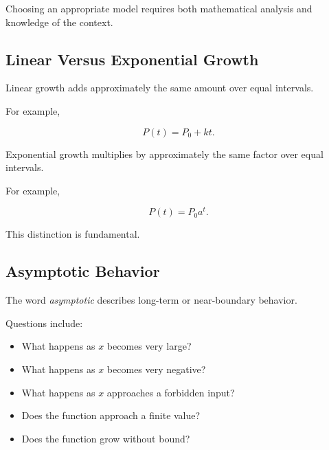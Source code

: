 Choosing an appropriate model requires both mathematical analysis and
knowledge of the context.

\subsection{Linear Versus Exponential Growth}
\label{subsec:linear-exponential-growth}

Linear growth adds approximately the same amount over equal intervals.

For example,

\[ P(t)=P_0+kt. \]

Exponential growth multiplies by approximately the same factor over equal
intervals.

For example,

\[ P(t)=P_0a^t. \]

This distinction is fundamental.

\begin{center}
\end{center}

\subsection{Asymptotic Behavior}
\label{subsec:precalculus-asymptotic-behavior}

The word \emph{asymptotic} describes long-term or near-boundary behavior.

Questions include:

\begin{itemize}
    \item What happens as \(x\) becomes very large?
    \item What happens as \(x\) becomes very negative?
    \item What happens as \(x\) approaches a forbidden input?
    \item Does the function approach a finite value?
    \item Does the function grow without bound?
\end{itemize}

